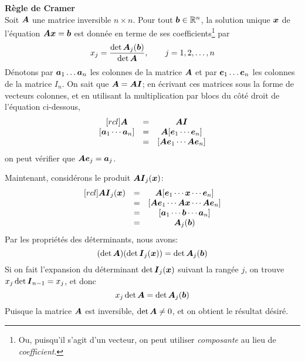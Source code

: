 \begin{theo}
\textbf{Règle de Cramer}\\
Soit $\boldsymbol{A}$ une matrice inversible $n\times  n$.  Pour tout $\boldsymbol{b}\in\mathbb{R}^n$, la solution unique $\boldsymbol{x}$ de l'équation
$\boldsymbol{A}\boldsymbol{x} = \boldsymbol{b}$ est donnée en terme de ses coefficients\footnote{Ou, puisqu'il s'agit d'un vecteur, on peut utiliser \textit{composante} au lieu de \textit{coefficient}.} par
\[
x_j = \frac{\det \boldsymbol{A}_j(\boldsymbol{b})}{\det \boldsymbol{A}}, \qquad j=1, 2, \ldots, n
\]
\proof
Dénotons par $\boldsymbol{a}_1 \ldots \boldsymbol{a}_n$ les colonnes de la matrice $\boldsymbol{A}$ et par $\boldsymbol{e}_1 \ldots \boldsymbol{e}_n$
les colonnes de la matrice $I_n$.  On sait que $\boldsymbol{A} = \boldsymbol{A}\boldsymbol{I}$; en écrivant ces
matrices sous la forme de vecteurs colonnes, et en utilisant la multiplication par blocs
du côté droit de l'équation ci-dessous,
\[
\begin{matrix}[rcl]
\matA &=& \matA \matI \\ 
[\mat{a}_1 \cdots  \mat{a}_n] &=& \matA[ \mat{e}_1 \cdots \mat{e}_n] \\
&=& [\matA\mat{e}_1  \cdots \matA\mat{e}_n] \\
\end{matrix}
\]
on peut vérifier que $\boldsymbol{A} \boldsymbol{e}_j = \boldsymbol{a}_j$.

Maintenant, considérons le produit $\boldsymbol{A} \boldsymbol{I}_j(\boldsymbol{x})$:
\[
\begin{matrix}[rcl]
\boldsymbol{A} \boldsymbol{I}_j(\boldsymbol{x}) &=& \boldsymbol{A}[ \boldsymbol{e}_1 \cdots \boldsymbol{x} \cdots \boldsymbol{e}_n] \\
 &=& [\boldsymbol{A}\boldsymbol{e}_1 \cdots \boldsymbol{A}\boldsymbol{x} \cdots \boldsymbol{A}\boldsymbol{e}_n] \\
 &=& [\boldsymbol{a}_1 \cdots \boldsymbol{b} \cdots \boldsymbol{a}_n] \\
 &=& \boldsymbol{A}_j(\boldsymbol{b})
\end{matrix}
\]
Par les propriétés des déterminants, nous avons:
\[
(\det\boldsymbol{A})(\det \boldsymbol{I}_j(\boldsymbol{x})) = \det \boldsymbol{A}_j(\boldsymbol{b})
\]
Si on fait l'expansion du déterminant $\det \boldsymbol{I}_j(\boldsymbol{x})$ suivant la rangée $j$, on trouve $x_j \det \boldsymbol{I}_{n-1} = x_j$,
et donc
\[
x_j \det\boldsymbol{A} = \det \boldsymbol{A}_j(\boldsymbol{b})
\]
Puisque la matrice $\boldsymbol{A}$ est inversible, $\det\boldsymbol{A} \neq 0$, et on obtient le résultat désiré.
\cqfd
\end{theo}


